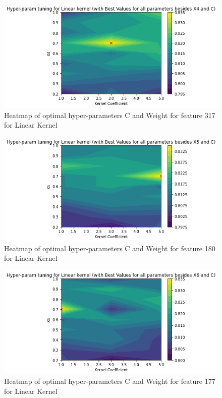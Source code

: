 \begin{figure}[h!]
    \includegraphics[width=\textwidth]{figures/final/linear_x4.png}
    \caption{\label{fig:lin_317} Heatmap of optimal hyper-parameters C and Weight for feature 317 for Linear Kernel}
\end{figure}
\begin{figure}[h!]
    \includegraphics[width=\textwidth]{figures/final/linear_x5.png}
    \caption{\label{fig:lin_180} Heatmap of optimal hyper-parameters C and Weight for feature 180 for Linear Kernel}
\end{figure}
\begin{figure}[h!]
    \includegraphics[width=\textwidth]{figures/final/linear_x6.png}
    \caption{\label{fig:lin_177} Heatmap of optimal hyper-parameters C and Weight for feature 177 for Linear Kernel}
\end{figure}
